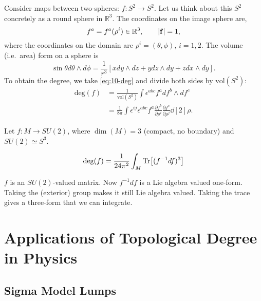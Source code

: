 
\begin{example}[]
  Consider maps between two-spheres: $f \colon S^2 \to S^2$.
  Let us think about this $S^2$ concretely as a round sphere in $\mathbb{R}^3$.
  The coordinates on the image sphere are,
  \begin{equation}
    f^a = f^a (\rho^i) \in \mathbb{R}^3, \qquad \abs{\vb{f}} = 1,
  \end{equation}
  where the coordinates on the domain are $\rho^{i} = (\theta, \phi)$, $i = 1, 2$.
  The volume (i.e.~area) form on a sphere is 
  \begin{equation}
    \sin \theta d\theta \wedge d\phi = \frac{1}{r^3} [x dy \wedge d z + y dz \wedge dy + z dx \wedge dy].
  \end{equation}
  To obtain the degree, we take \eqref{eq:10-deg} and divide both sides by $\text{vol}(S^2)$:
  \begin{align}
    \text{deg}(f) &= \frac{1}{\text{vol}(S^2)} \int \epsilon^{abc} f^{a} df^{b} \wedge df^{c} \\
		  &= \frac{1}{8\pi} \int \epsilon^{ij} \epsilon^{abc} f^{a} \frac{\partial f^{b}}{\partial \rho^{i}} \frac{\partial f^{c}}{\partial \rho^{j}} \dd[2]{\rho}.
  \end{align}
\end{example}

\begin{example}[]
  Let $f \colon M \to SU(2)$, where $\dim(M) = 3$ (compact, no boundary) and $SU(2) \simeq S^3$.
  \begin{exercise}
    \begin{equation}
      \text{deg}(f) = \frac{1}{24 \pi^2} \int_M \Tr[(f^{-1} df)^3]
    \end{equation}
  \end{exercise}
  $f$ is an $SU(2)$-valued matrix. Now $f^{-1} df$ is a Lie algebra valued one-form.
  Taking the (exterior) group makes it still Lie algebra valued. Taking the trace gives a three-form that we can integrate.
\end{example}

\section{Applications of Topological Degree in Physics}%
\label{sec:applications_of_topological_degree_in_physics}

\subsection{Sigma Model Lumps}%
\label{sub:sigma_model_lumps}

